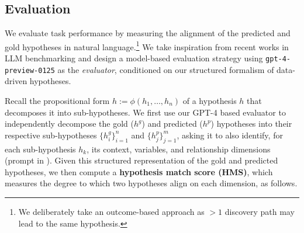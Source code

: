 \subsection{Evaluation}
We evaluate task performance by measuring the alignment of the predicted and gold hypotheses in natural language.\footnote{We deliberately take an outcome-based approach as $> 1$ discovery path may lead to the same hypothesis.} We take inspiration from recent works in LLM benchmarking \cite{Shashidhar2023DemocratizingLA,Zeng2023EvaluatingLL,Yuan2023EvaluatingIL,Fu2023GPTScoreEA,alpaca_eval,wildbench2024} and design a model-based evaluation strategy using \texttt{gpt-4-preview-0125} as the \emph{evaluator}, conditioned on our structured formalism of data-driven hypotheses.


Recall the propositional form $h := \phi(h_1,\ldots,h_n)$ of a hypothesis $h$ that decomposes it into sub-hypotheses. We first use our GPT-4 based evaluator to independently decompose the gold ($h^g$) and predicted ($h^p$) hypotheses into their respective sub-hypotheses $\{h^g_i\}_{i=1}^n$ and $\{h^p_j\}_{j=1}^m$,
asking it to also identify, for each sub-hypothesis $h_k$,
its context, variables, and relationship dimensions (prompt in ). Given this structured representation of the gold and predicted hypotheses, we then compute a \textbf{hypothesis match score (HMS)}, which measures the degree to which two hypotheses align on each dimension, as follows.



